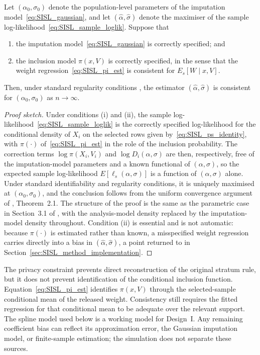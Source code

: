 \begin{proposition}
\label{prop:SISL_consistency}
Let $(\alpha_0,\sigma_0)$ denote the population-level parameters of the imputation model~\eqref{eq:SISL_gaussian}, and let $(\hat{\alpha},\hat{\sigma})$ denote the maximiser of the sample log-likelihood~\eqref{eq:SISL_sample_loglik}. Suppose that
\begin{enumerate}[label=(\roman*)]
\item the imputation model~\eqref{eq:SISL_gaussian} is correctly specified; and
\item the inclusion model $\pi(x, V)$ is correctly specified, in the sense that the weight regression~\eqref{eq:SISL_pi_est} is consistent for $E_s[W \mid x, V]$.
\end{enumerate}
Then, under standard regularity conditions \citep{newey1994large}, the estimator $(\hat{\alpha},\hat{\sigma})$ is consistent for $(\alpha_0,\sigma_0)$ as $n \to \infty$.
\end{proposition}
 
\begin{proof}[Proof sketch]
Under conditions (i) and (ii), the sample log-likelihood~\eqref{eq:SISL_sample_loglik} is the correctly specified log-likelihood for the conditional density of $X_i$ on the selected rows given by~\eqref{eq:SISL_ps_identity}, with $\pi(\cdot)$ of~\eqref{eq:SISL_pi_est} in the role of the inclusion probability. The correction terms $\log \pi(X_i, V_i)$ and $\log D_i(\alpha,\sigma)$ are then, respectively, free of the imputation-model parameters and a known functional of $(\alpha,\sigma)$, so the expected sample log-likelihood $E[\ell_s(\alpha,\sigma)]$ is a function of $(\alpha,\sigma)$ alone. Under standard identifiability and regularity conditions, it is uniquely maximised at $(\alpha_0,\sigma_0)$, and the conclusion follows from the uniform convergence argument of \citet{newey1994large}, Theorem~2.1. The structure of the proof is the same as the parametric case in Section~3.1 of \citet{pfeffermann1999parametric}, with the analysis-model density replaced by the imputation-model density throughout. Condition (ii) is essential and is not automatic: because $\pi(\cdot)$ is estimated rather than known, a misspecified weight regression carries directly into a bias in $(\hat{\alpha},\hat{\sigma})$, a point returned to in Section~\ref{sec:SISL_method_implementation}.
\end{proof}

The privacy constraint prevents direct reconstruction of the original stratum rule, but it does not prevent identification of the conditional inclusion function. Equation~\eqref{eq:SISL_pi_est} identifies $\pi(x,V)$ through the selected-sample conditional mean of the released weight. Consistency still requires the fitted regression for that conditional mean to be adequate over the relevant support. The spline model used below is a working model for Design~I. Any remaining coefficient bias can reflect its approximation error, the Gaussian imputation model, or finite-sample estimation; the simulation does not separate these sources.
 
